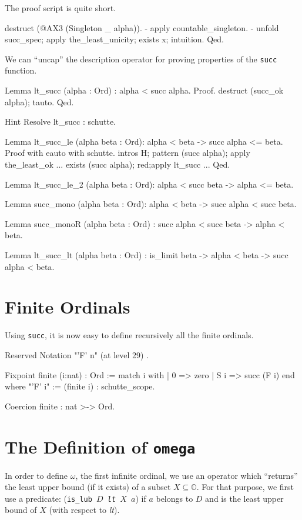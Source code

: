 {The \coq{} proof script is quite short.

\begin{Coqsrc}
  destruct (@AX3 (Singleton _ alpha)).
  - apply countable_singleton.
  -  unfold succ_spec; apply the_least_unicity;  exists x; intuition.
Qed.     
\end{Coqsrc}


We can ``uncap'' the description operator for proving properties of the
\texttt{succ} function.

\begin{Coqsrc}
Lemma lt_succ (alpha : Ord) :  alpha < succ alpha.
Proof.
  destruct  (succ_ok  alpha);  tauto.
Qed.

Hint Resolve lt_succ : schutte.

Lemma lt_succ_le (alpha beta : Ord):
  alpha < beta -> succ alpha <= beta.
Proof with eauto with schutte.
  intros  H;  pattern (succ alpha); apply the_least_ok ... 
  exists (succ alpha); red;apply lt_succ ...
Qed.
\end{Coqsrc}


\begin{Coqsrc}
Lemma lt_succ_le_2 (alpha beta : Ord):
  alpha < succ beta -> alpha <= beta.

Lemma succ_mono (alpha beta : Ord):
  alpha < beta -> succ alpha < succ beta.

Lemma succ_monoR (alpha beta : Ord) :
 succ alpha < succ beta -> alpha < beta.

Lemma lt_succ_lt (alpha beta : Ord) :
  is_limit beta ->  alpha < beta -> succ alpha < beta.
\end{Coqsrc}

\section{Finite Ordinals}

Using \texttt{succ}, it is now easy to define recursively all the finite ordinals.

\label{sect:notation-F-sch}

\begin{Coqsrc}
Reserved Notation "'F' n" (at level 29) .

Fixpoint finite (i:nat) : Ord :=
  match i with 
            | 0 => zero
            | S i => succ (F i)
  end
where "'F' i" := (finite i)  : schutte_scope.

Coercion finite : nat >-> Ord.
\end{Coqsrc}

\section{The Definition of \texttt{omega}}
In order to define $\omega$, the first infinite ordinal, we use an operator which
``returns'' the least upper bound (if it exists) of a subset $X\subseteq \mathbb{O}$.
For that purpose, we first use a predicate:
(\texttt{is\_lub $D$ \textit{lt} $X$ $a$}) if $a$ belongs to $D$ and is the least 
upper bound  of $X$ (with respect to \textit{lt}).


}

